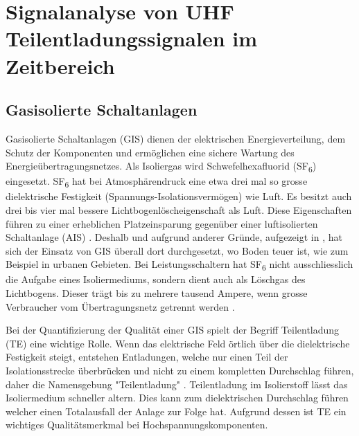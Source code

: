 %
%
%
\chapter{Signalanalyse von UHF Teilentladungssignalen im Zeitbereich \label{chapter:gis}}
\begin{refsection}

\section{Gasisolierte Schaltanlagen}

Gasisolierte Schaltanlagen (GIS) dienen der elektrischen Energieverteilung, dem Schutz der Komponenten und ermöglichen eine sichere Wartung des Energieübertragungsnetzes.
%
%
%
Als Isoliergas wird Schwefelhexafluorid (SF\textsubscript{6}) eingesetzt. SF\textsubscript{6} hat bei Atmosphärendruck eine etwa drei mal so grosse dielektrische Festigkeit (Spannungs-Isolationsvermögen) wie Luft. 
%
%
Es besitzt auch drei bis vier mal bessere Lichtbogenlöscheigenschaft als Luft. 
%
Diese Eigenschaften führen zu einer erheblichen Platzeinsparung gegenüber einer luftisolierten Schaltanlage (AIS) \cite{buch:ABB}.
Deshalb und aufgrund anderer Gründe, aufgezeigt in \cite{buch:GIS/AIS}, hat sich der Einsatz von GIS überall dort durchgesetzt, wo Boden teuer ist, wie zum Beispiel in urbanen Gebieten. 
Bei Leistungsschaltern hat SF\textsubscript{6} nicht ausschliesslich die Aufgabe eines Isoliermediums, sondern dient auch als Löschgas des Lichtbogens.
Dieser trägt bis zu mehrere tausend Ampere, wenn grosse Verbraucher vom Übertragungsnetz getrennt werden \cite{buch:ABB}. 

Bei der Quantifizierung der Qualität einer GIS spielt der Begriff Teilentladung (TE) eine wichtige Rolle. 
%
Wenn das elektrische Feld örtlich über die dielektrische Festigkeit steigt, entstehen Entladungen, welche nur einen Teil der Isolationsstrecke überbrücken und nicht zu einem kompletten Durchschlag führen, daher die Namensgebung "Teilentladung" \cite{buch:Kuchler}.
Teilentladung im Isolierstoff lässt das Isoliermedium  schneller altern. Dies kann zum dielektrischen Durchschlag führen welcher einen Totalausfall der Anlage zur Folge hat.
Aufgrund dessen ist TE ein wichtiges Qualitätsmerkmal bei Hochspannungskomponenten. 


\end{refsection}

